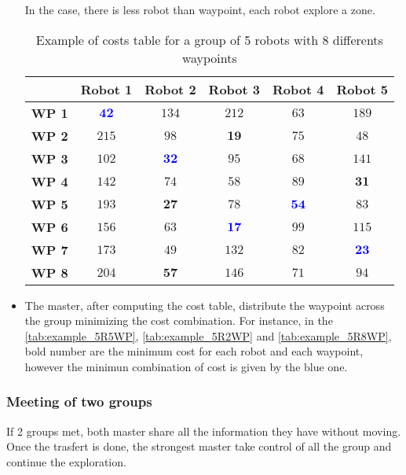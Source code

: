 \documentclass[main.tex]{subfiles}
\begin{document}
\begin{itemize}
	In the case, there is less robot than waypoint, each robot explore a zone.
	
	\begin{table}[H]
		\centering
		\begin{tabular}{|c|c|c|c|c|c|}
			\hline
			& \textbf{Robot 1} & \textbf{Robot 2} & \textbf{Robot 3} & \textbf{Robot 4} & \textbf{Robot 5}\\
			\hline
			\textbf{WP 1} & \textcolor{blue}{$\mathbf{42}$} & $134$ & $212$ & $63$ & $189$ \\
			\hline
			\textbf{WP 2} & $215$ & $98$ & $\mathbf{19}$ & $75$ & $48$ \\
			\hline
			\textbf{WP 3} & $102$ & \textcolor{blue}{$\mathbf{32}$} & $95$ & $68$ & $141$ \\
			\hline
			\textbf{WP 4} & $142$ & $74$ & $58$ & $89$ & $\mathbf{31}$ \\
			\hline
			\textbf{WP 5} & $193$ & $\mathbf{27}$ & $78$ & \textcolor{blue}{$\mathbf{54}$} & $83$ \\ 
			\hline
			\textbf{WP 6} & $156$ & $63$ & \textcolor{blue}{$\mathbf{17}$} & $99$ & $115$ \\
			\hline
			\textbf{WP 7} & $173$ & $49$ & $132$ & $82$ & \textcolor{blue}{$\mathbf{23}$} \\
			\hline
			\textbf{WP 8} & $204$ & $\mathbf{57}$ & $146$ & $71$ & $94$ \\ 
			\hline
		\end{tabular}
		\caption{Example of costs table for a group of 5 robots with 8 differents waypoints}
		\label{tab:example_5R8WP}
	\end{table}

	\item The master, after computing the cost table, distribute the waypoint across the group minimizing the cost combination. For instance, in the \autoref{tab:example_5R5WP}, \autoref{tab:example_5R2WP} and \autoref{tab:example_5R8WP}, bold number are the minimum cost for each robot and each waypoint, however the minimun combination of cost is given by the blue one.

\end{itemize}

\subsubsection{Meeting of two groups}

If 2 groups met, both master share all the information they have without moving. Once the trasfert is done, the strongest master take control of all the group and continue the exploration.
\end{document}
